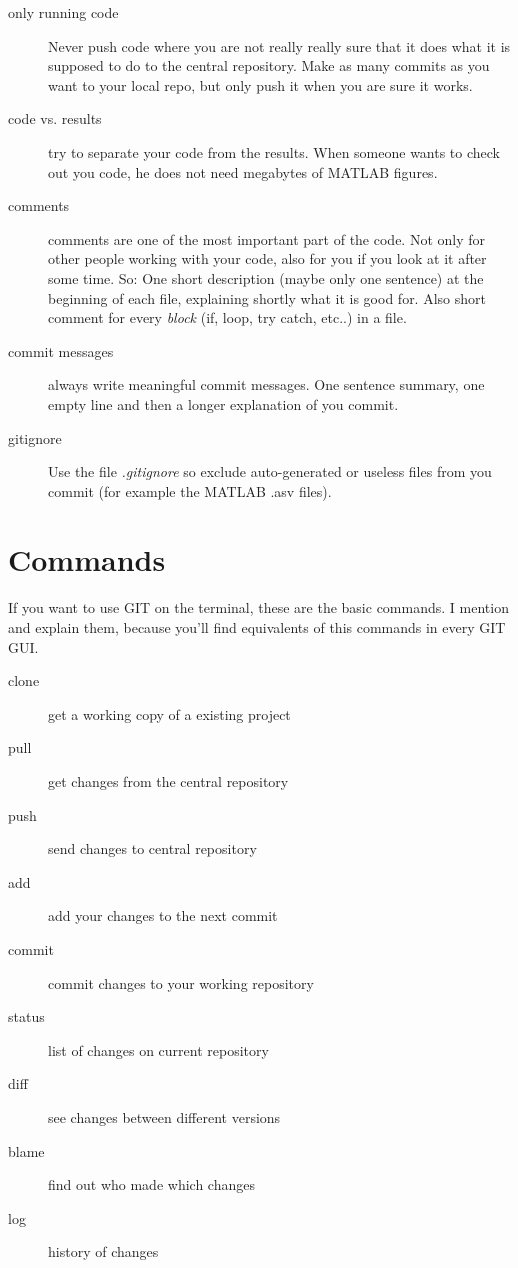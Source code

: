 \documentclass[]{article}
\begin{document}
\begin{description}
	\item[only running code] Never push code where you are not really really sure that it does what it is supposed to do to the central repository. Make as many commits as you want to your local repo, but only push it when you are sure it works.	
	\item[code vs. results] try to separate your code from the results. When someone wants to check out you code, he does not need megabytes of MATLAB figures.
	\item[comments] comments are one of the most important part of the code. Not only for other people working with your code, also for you if you look at it after some time. So: One short description (maybe only one sentence) at the beginning of each file, explaining shortly what it is good for. Also short comment for every \emph{block} (if, loop, try catch, etc..) in a file.
	\item[commit messages] always write meaningful commit messages. One sentence summary, one empty line and then a longer explanation of you commit.
	\item[gitignore] Use the file \emph{.gitignore} so exclude auto-generated or useless files from you commit (for example the MATLAB .asv files).
    
\end{description}
    

\section{Commands}

If you want to use GIT on the terminal, these are the basic commands.
I mention and explain them, because you'll find equivalents of this commands
in every GIT GUI.

\begin{description}
	\item[clone] get a working copy of a existing project
	\item[pull] get changes from the central repository
	\item[push] send changes to central repository
	\item[add] add your changes to the next commit
	\item[commit] commit changes to your working repository
	\item[status] list of changes on current repository
	\item[diff] see changes between different versions
	\item[blame] find out who made which changes
	\item[log] history of changes
\end{description}
\end{document}
